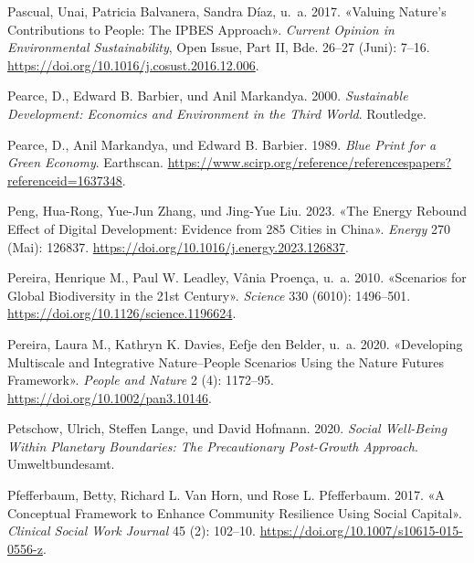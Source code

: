 \documentclass[
  nswissgerman,
  a4paper,
  openany]{book}
\newlength{\cslhangindent}
\newenvironment{CSLReferences}[2] %
 {\begin{list}{}{%
  \setlength{\itemindent}{0pt}
  \setlength{\leftmargin}{0pt}
  \setlength{\parsep}{0pt}
  \ifodd #1
   \setlength{\leftmargin}{\cslhangindent}
   \setlength{\itemindent}{-1\cslhangindent}
  \fi
  \setlength{\itemsep}{#2\baselineskip}}}
 {\end{list}}
\begin{document}
\begin{CSLReferences}{1}{1}
{Pascual, Unai, Patricia Balvanera, Sandra Díaz, u.~a.} 2017. {«Valuing
Nature's Contributions to People: The {IPBES} Approach»}. \emph{Current
Opinion in Environmental Sustainability}, Open Issue, Part {II}, Bde.
26--27 (Juni): 7--16.
\url{https://doi.org/10.1016/j.cosust.2016.12.006}.

Pearce, D., Edward B. Barbier, und Anil Markandya. 2000.
\emph{Sustainable {Development}: {Economics} and {Environment} in the
{Third World}}. Routledge.

Pearce, D., Anil Markandya, und Edward B. Barbier. 1989. \emph{Blue
{Print} for a {Green} {Economy}}. Earthscan.
\url{https://www.scirp.org/reference/referencespapers?referenceid=1637348}.

Peng, Hua-Rong, Yue-Jun Zhang, und Jing-Yue Liu. 2023. {«The Energy
Rebound Effect of Digital Development: {Evidence} from 285 Cities in
{China}»}. \emph{Energy} 270 (Mai): 126837.
\url{https://doi.org/10.1016/j.energy.2023.126837}.

Pereira, Henrique M., Paul W. Leadley, Vânia Proença, u.~a. 2010.
{«Scenarios for {Global} {Biodiversity} in the 21st {Century}»}.
\emph{Science} 330 (6010): 1496--501.
\url{https://doi.org/10.1126/science.1196624}.

{Pereira, Laura M., Kathryn K. Davies, Eefje den Belder, u.~a.} 2020.
{«Developing Multiscale and Integrative Nature--People Scenarios Using
the {Nature Futures Framework}»}. \emph{People and Nature} 2 (4):
1172--95. \url{https://doi.org/10.1002/pan3.10146}.

Petschow, Ulrich, Steffen Lange, und David Hofmann. 2020. \emph{Social
{Well-Being Within Planetary Boundaries}: The {Precautionary Post-Growth
Approach}}. Umweltbundesamt.

Pfefferbaum, Betty, Richard L. Van Horn, und Rose L. Pfefferbaum. 2017.
{«A {Conceptual Framework} to {Enhance Community Resilience Using Social
Capital}»}. \emph{Clinical Social Work Journal} 45 (2): 102--10.
\url{https://doi.org/10.1007/s10615-015-0556-z}.


\end{CSLReferences}
\end{document}
